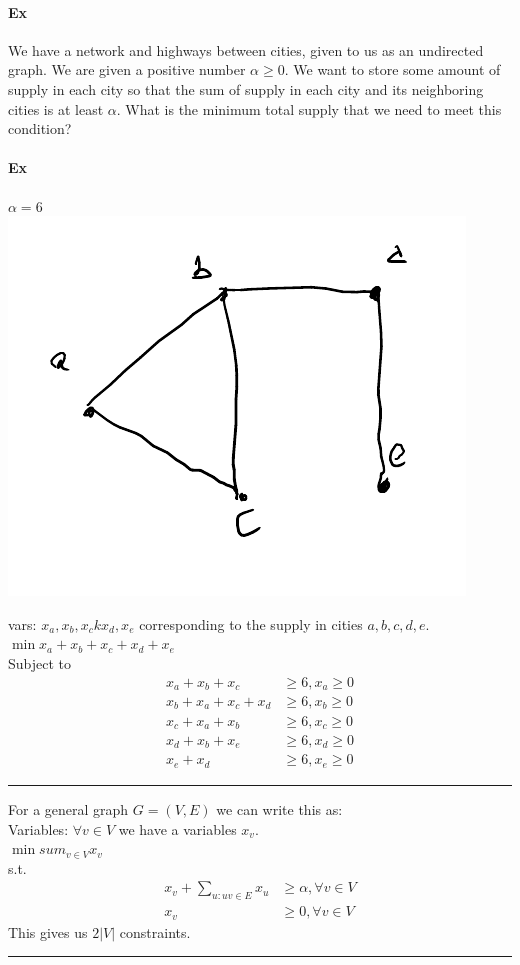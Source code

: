 \documentclass[12 pt]{article}
\begin{document}
        \paragraph{Ex} We have a network and highways between cities,
        given to us as an undirected graph. We are given a positive
        number $\alpha \geq 0$. We want to store some amount of supply
        in each city so that the sum of supply in each city and its
        neighboring cities is at least $\alpha$. What is the minimum
        total supply that we need to meet this condition?
        \paragraph{Ex} $\alpha = 6$
        \\ \includegraphics[width=.9\textwidth]{i99.pdf}

        vars: $x_a, x_b, x_ck x_d, x_e$ corresponding to the supply in
        cities $a,b,c,d,e$.
        \\ $\min x_a + x_b + x_c + x_d + x_e$
        \\ Subject to
        \begin{align*}
          x_a + x_b + x_c & \geq 6, x_a \geq 0
          \\x_b + x_a + x_c + x_d & \geq 6, x_b \geq 0
          \\x_c + x_a + x_b & \geq 6, x_c \geq 0
          \\x_d + x_b + x_e & \geq 6, x_d \geq 0
          \\ x_e + x_d & \geq 6, x_e \geq 0
        \end{align*}
        \noindent \rule{\textwidth}{0.5pt}
        For a general graph $G=(V,E)$ we can write this as:
        \\ Variables: $\forall v \in V$ we have a variables $x_v$.
        \\ $\min sum_{v \in V}x_v$
        \\ s.t.
        \begin{align*}
          x_v + \sum_{u:uv\in E} x_u & \geq \alpha, \forall v \in V
          \\ x_v & \geq 0, \forall v \in V
        \end{align*}
        This gives us $2|V|$ constraints.
        \noindent \rule{\textwidth}{0.5pt}
\end{document}
